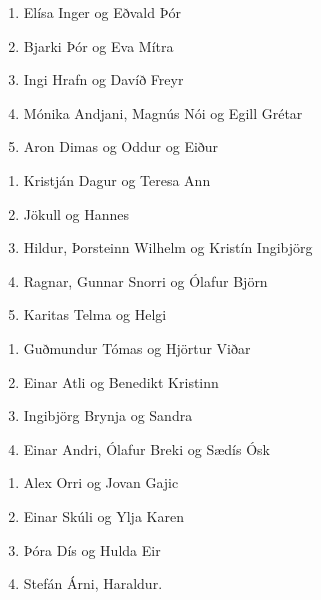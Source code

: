 \begin{multicols}{2}
\begin{enumerate}[label = \textbf{Mán \arabic*:}]
    \item Elísa Inger og Eðvald Þór
    \item Bjarki Þór og Eva Mítra
    \item Ingi Hrafn og Davíð Freyr
    \item Mónika Andjani, Magnús Nói og Egill Grétar
    \item Aron Dimas  og Oddur og Eiður \columnbreak
\end{enumerate}

\begin{enumerate}[label = \textbf{Fös \arabic*:}]
    \item Kristján Dagur og Teresa Ann
    \item Jökull og Hannes
    \item Hildur, Þorsteinn Wilhelm  og Kristín Ingibjörg
    \item Ragnar, Gunnar Snorri og Ólafur Björn
    \item Karitas Telma og Helgi
\end{enumerate}
\end{multicols}

\vspace{0.5cm}

\begin{multicols}{2}
\begin{enumerate}[label = \textbf{Þri \arabic*:}]
    \item Guðmundur Tómas og Hjörtur Viðar
    \item Einar Atli og Benedikt Kristinn
    \item Ingibjörg Brynja og Sandra
    \item Einar Andri, Ólafur Breki og Sædís Ósk \columnbreak
\end{enumerate}

\begin{enumerate}[label = \textbf{Fim \arabic*:}]
    \item Alex Orri og Jovan Gajic
    \item Einar Skúli og Ylja Karen
    \item Þóra Dís og Hulda Eir
    \item Stefán Árni, Haraldur.
\end{enumerate}
\end{multicols}

\hspace{0.5cm}


